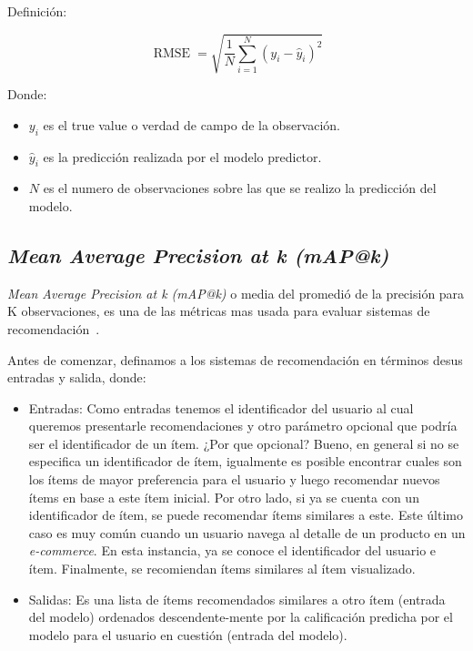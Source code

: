 \documentclass[11pt,a4paper,twoside]{thesis}
\begin{document}
\begin{description}
	\item[Definición:]
\end{description}

\begin{equation}
	\operatorname{RMSE}=\sqrt{\frac{1}{N} \sum_{i=1}^N (y_i - \hat y_i)^2}
\end{equation}

\begin{description}
	\item[Donde:]
\end{description}

\begin{itemize}
	\item $y_i$ es el true value o verdad de campo de la observación.
	\item $\hat y_i$ es la predicción realizada por el modelo predictor.
	\item $N$ es el numero de observaciones sobre las que se realizo la predicción del modelo.
\end{itemize}

\subsection{\textit{Mean Average Precision at k (mAP@k)}}
\label{sec:map_ref}

\textit{Mean Average Precision at k (mAP@k)} o media del promedió de la
precisión para K observaciones, es una de las métricas mas usada
para evaluar sistemas de recomendación~\cite{map_at_k_1, map_at_k_2, map_at_k_3}.

Antes de comenzar, definamos a los sistemas de recomendación en términos desus
entradas y salida, donde:

\begin{itemize}
	\item Entradas: Como entradas tenemos el identificador del usuario al cual queremos
	      presentarle recomendaciones y otro parámetro opcional que podría ser el
	      identificador de un ítem. ¿Por que opcional? Bueno, en general si no se
	      especifica un identificador de ítem, igualmente es posible encontrar cuales son
	      los ítems de mayor preferencia para el usuario y luego recomendar nuevos ítems
	      en base a este ítem inicial. Por otro lado, si ya se cuenta con un
	      identificador de ítem, se puede recomendar ítems similares a este. Este último
	      caso es muy común cuando un usuario navega al detalle de un producto en un
	      \textit{e-commerce}. En esta instancia, ya se conoce el identificador del
	      usuario e ítem. Finalmente, se recomiendan ítems similares al ítem visualizado.
	\item Salidas: Es una lista de ítems recomendados similares a otro ítem (entrada del
	      modelo) ordenados descendente-mente por la calificación predicha por el modelo
	      para el usuario en cuestión (entrada del modelo).
\end{itemize}
\end{document}
